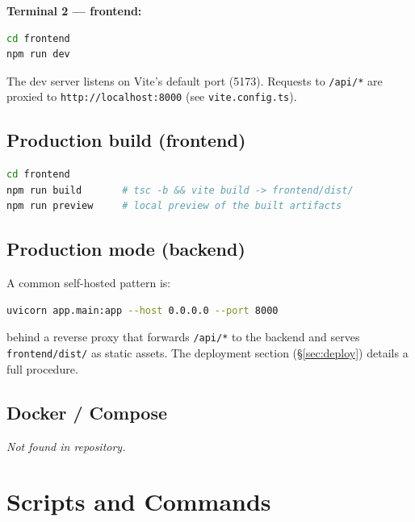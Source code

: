 \documentclass[11pt,a4paper]{article}
\begin{document}
\textbf{Terminal 2 --- frontend:}
\begin{lstlisting}[language=bash]
cd frontend
npm run dev
\end{lstlisting}

The dev server listens on Vite's default port (5173). Requests to
\texttt{/api/*} are proxied to \texttt{http://localhost:8000} (see
\texttt{vite.config.ts}).

\subsection{Production build (frontend)}
\begin{lstlisting}[language=bash]
cd frontend
npm run build       # tsc -b && vite build -> frontend/dist/
npm run preview     # local preview of the built artifacts
\end{lstlisting}

\subsection{Production mode (backend)}
A common self-hosted pattern is:
\begin{lstlisting}[language=bash]
uvicorn app.main:app --host 0.0.0.0 --port 8000
\end{lstlisting}
behind a reverse proxy that forwards \texttt{/api/*} to the backend and serves
\texttt{frontend/dist/} as static assets. The deployment section
(\S\ref{sec:deploy}) details a full procedure.

\subsection{Docker / Compose}
\emph{Not found in repository.}

\section{Scripts and Commands}
\label{sec:scripts}
\end{document}
